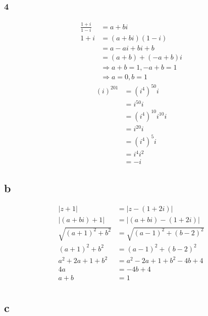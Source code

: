\documentclass{article}
\begin{document}
\subsubsection*{4}
\begin{align*}
    \frac{1+i}{1-i}&=a+bi\\
    1+i&=(a+bi)(1-i)\\
    &=a-ai+bi+b\\
    &=(a+b)+(-a+b)i\\
    &\Rightarrow a+b=1,-a+b=1\\
    &\Rightarrow a=0,b=1
\end{align*}
\begin{align*}
    (i)^{201}&=(i^4)^{50}i\\
    &=i^{50}i\\
    &=(i^4)^{10}i^{10}i\\
    &=i^{20}i\\
    &=(i^4)^{5}i\\
    &=i^4i^2\\
    &=-i
\end{align*}
\subsection*{b}
\begin{align*}
    |z+1|&=|z-(1+2i)|\\
    |(a+bi)+1|&=|(a+bi)-(1+2i)|\\
    \sqrt{(a+1)^2+b^2}&=\sqrt{(a-1)^2+(b-2)^2}\\
    (a+1)^2+b^2&=(a-1)^2+(b-2)^2\\
    a^2+2a+1+b^2&=a^2-2a+1+b^2-4b+4\\
    4a&=-4b+4\\
    a+b&=1\\
\end{align*}
\subsection*{c}
\end{document}
